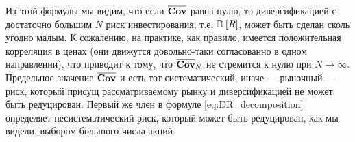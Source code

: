 Из этой формулы мы видим, что если $\overline{\textbf{Cov}}$ равна нулю, то диверсификацией с достаточно большим $N$ риск инвестирования,
т.е. $\mathbb{D}\left[R\right]$, может быть сделан сколь угодно малым. К сожалению, на практике, как правило, имеется положительная корреляция в ценах
(они движутся довольно-таки согласованно в одном направлении), что приводит к тому, что
$\overline{\textbf{Cov}}_N$ не стремится к нулю при $N \rightarrow \infty$. Предельное значение $\overline{\textbf{Cov}}$ и есть тот систематический,
иначе --- рыночный --- риск, который присущ рассматриваемому рынку и диверсификацией не может быть редуцирован. Первый же член в формуле
\ref{eq:DR_decomposition} определяет несистематический риск, который может быть редуцирован, как мы видели, выбором большого числа акций.